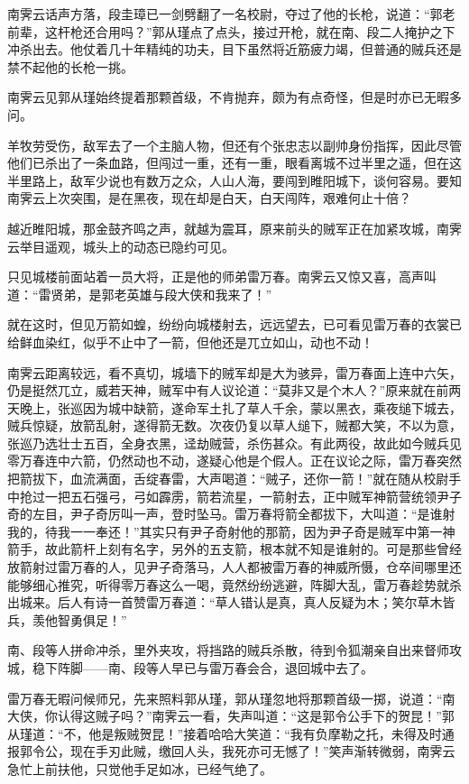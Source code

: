 \documentclass[12pt,oneside]{book}
\begin{document}
南霁云话声方落，段圭璋已一剑劈翻了一名校尉，夺过了他的长枪，说道：``郭老前辈，这杆枪还合用吗？''郭从瑾点了点头，接过开枪，就在南、段二人掩护之下冲杀出去。他仗着几十年精纯的功夫，目下虽然将近筋疲力竭，但普通的贼兵还是禁不起他的长枪一挑。

南霁云见郭从瑾始终提着那颗首级，不肯抛弃，颇为有点奇怪，但是时亦已无暇多问。

羊牧劳受伤，敌军去了一个主脑人物，但还有个张忠志以副帅身份指挥，因此尽管他们已杀出了一条血路，但闯过一重，还有一重，眼看离城不过半里之遥，但在这半里路上，敌军少说也有数万之众，人山人海，要闯到睢阳城下，谈何容易。要知南霁云上次突围，是在黑夜，现在却是白天，白天闯阵，艰难何止十倍？

越近睢阳城，那金鼓齐鸣之声，就越为震耳，原来前头的贼军正在加紧攻城，南霁云举目遥观，城头上的动态已隐约可见。

只见城楼前面站着一员大将，正是他的师弟雷万春。南霁云又惊又喜，高声叫道：``雷贤弟，是郭老英雄与段大侠和我来了！''

就在这时，但见万箭如蝗，纷纷向城楼射去，远远望去，已可看见雷万春的衣裳已给鲜血染红，似乎不止中了一箭，但他还是兀立如山，动也不动！

南霁云距离较远，看不真切，城墙下的贼军却是大为骇异，雷万春面上连中六矢，仍是挺然兀立，威若天神，贼军中有人议论道：``莫非又是个木人？''原来就在前两天晚上，张巡因为城中缺箭，遂命军土扎了草人千余，蒙以黑衣，乘夜缒下城去，贼兵惊疑，放箭乱射，遂得箭无数。次夜仍复以草人缒下，贼都大笑，不以为意，张巡乃选壮士五百，全身衣黑，迳劫贼营，杀伤甚众。有此两役，故此如今贼兵见零万春连中六箭，仍然动也不动，遂疑心他是个假人。正在议论之际，雷万春突然把箭拔下，血流满面，舌绽春雷，大声喝道：``贼子，还你一箭！''就在随从校尉手中抢过一把五石强弓，弓如霹雳，箭若流星，一箭射去，正中贼军神箭营统领尹子奇的左目，尹子奇厉叫一声，登时坠马。雷万春将箭全都拔下，大叫道：``是谁射我的，待我一一奉还！''其实只有尹子奇射他的那箭，因为尹子奇是贼军中第一神箭手，故此箭杆上刻有名字，另外的五支箭，根本就不知是谁射的。可是那些曾经放箭射过雷万春的人，见尹子奇落马，人人都被雷万春的神威所慑，仓卒间哪里还能够细心推究，听得零万春这么一喝，竟然纷纷逃避，阵脚大乱，雷万春趁势就杀出城来。后人有诗一首赞雷万春道：``草人错认是真，真人反疑为木；笑尔草木皆兵，羡他智勇俱足！''

南、段等人拼命冲杀，里外夹攻，将挡路的贼兵杀散，待到令狐潮亲自出来督师攻城，稳下阵脚------南、段等人早已与雷万春会合，退回城中去了。

雷万春无暇问候师兄，先来照料郭从瑾，郭从瑾忽地将那颗首级一掷，说道：``南大侠，你认得这贼子吗？''南霁云一看，失声叫道：``这是郭令公手下的贺昆！''郭从瑾道：``不，他是叛贼贺昆！''接着哈哈大笑道：``我有负摩勒之托，未得及时通报郭令公，现在手刃此贼，缴回人头，我死亦可无憾了！''笑声渐转微弱，南霁云急忙上前扶他，只觉他手足如冰，已经气绝了。
\end{document}
